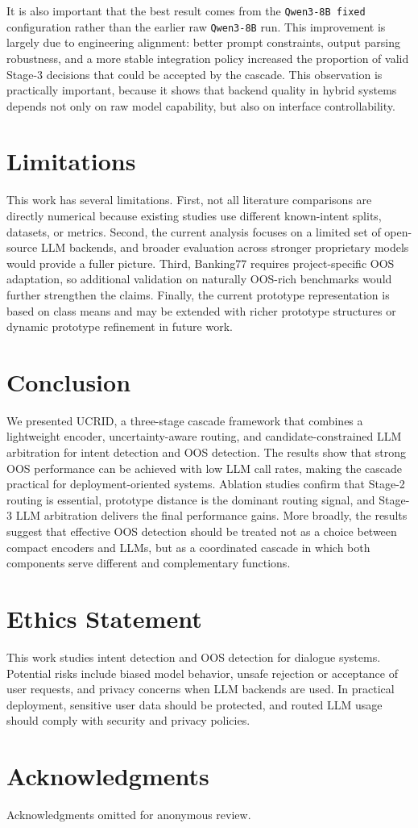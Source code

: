 \documentclass[11pt]{article}
\begin{document}
It is also important that the best result comes from the \texttt{Qwen3-8B fixed} configuration rather than the earlier raw \texttt{Qwen3-8B} run. This improvement is largely due to engineering alignment: better prompt constraints, output parsing robustness, and a more stable integration policy increased the proportion of valid Stage-3 decisions that could be accepted by the cascade. This observation is practically important, because it shows that backend quality in hybrid systems depends not only on raw model capability, but also on interface controllability.

\section{Limitations}
This work has several limitations. First, not all literature comparisons are directly numerical because existing studies use different known-intent splits, datasets, or metrics. Second, the current analysis focuses on a limited set of open-source LLM backends, and broader evaluation across stronger proprietary models would provide a fuller picture. Third, Banking77 requires project-specific OOS adaptation, so additional validation on naturally OOS-rich benchmarks would further strengthen the claims. Finally, the current prototype representation is based on class means and may be extended with richer prototype structures or dynamic prototype refinement in future work.

\section{Conclusion}
We presented UCRID, a three-stage cascade framework that combines a lightweight encoder, uncertainty-aware routing, and candidate-constrained LLM arbitration for intent detection and OOS detection. The results show that strong OOS performance can be achieved with low LLM call rates, making the cascade practical for deployment-oriented systems. Ablation studies confirm that Stage-2 routing is essential, prototype distance is the dominant routing signal, and Stage-3 LLM arbitration delivers the final performance gains. More broadly, the results suggest that effective OOS detection should be treated not as a choice between compact encoders and LLMs, but as a coordinated cascade in which both components serve different and complementary functions.

\section*{Ethics Statement}
This work studies intent detection and OOS detection for dialogue systems. Potential risks include biased model behavior, unsafe rejection or acceptance of user requests, and privacy concerns when LLM backends are used. In practical deployment, sensitive user data should be protected, and routed LLM usage should comply with security and privacy policies.

\section*{Acknowledgments}
Acknowledgments omitted for anonymous review.



\end{document}
